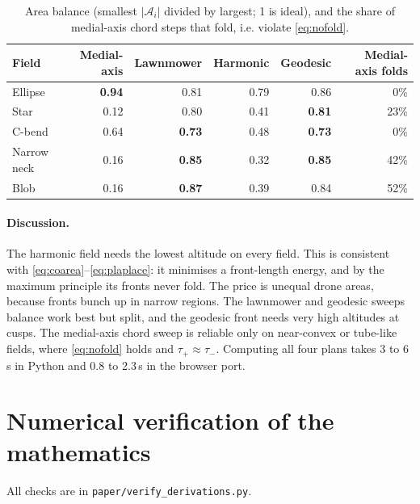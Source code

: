 \documentclass[11pt,a4paper]{article}
\numberwithin{equation}{section}
\theoremstyle{plain}
\theoremstyle{definition}
\theoremstyle{remark}
\begin{document}
\begin{table}[ht]
\centering
\caption{Area balance (smallest $|\mathcal A_i|$ divided by largest; 1 is ideal), and the share of medial-axis chord steps that fold, i.e. violate \eqref{eq:nofold}.}
\label{tab:balance}
\begin{tabular}{lrrrrr}
\toprule
Field & Medial-axis & Lawnmower & Harmonic & Geodesic & Medial-axis folds \\
\midrule
Ellipse     & \textbf{0.94} & 0.81          & 0.79 & 0.86          & 0\%  \\
Star        & 0.12          & 0.80          & 0.41 & \textbf{0.81} & 23\% \\
C-bend      & 0.64          & \textbf{0.73} & 0.48 & \textbf{0.73} & 0\%  \\
Narrow neck & 0.16          & \textbf{0.85} & 0.32 & \textbf{0.85} & 42\% \\
Blob        & 0.16          & \textbf{0.87} & 0.39 & 0.84          & 52\% \\
\bottomrule
\end{tabular}
\end{table}

\paragraph{Discussion.} The harmonic field needs the lowest altitude on every field. This is consistent with \eqref{eq:coarea}--\eqref{eq:plaplace}: it minimises a front-length energy, and by the maximum principle its fronts never fold. The price is unequal drone areas, because fronts bunch up in narrow regions. The lawnmower and geodesic sweeps balance work best but split, and the geodesic front needs very high altitudes at cusps. The medial-axis chord sweep is reliable only on near-convex or tube-like fields, where \eqref{eq:nofold} holds and $\tau_+\approx\tau_-$. Computing all four plans takes 3 to 6\,s in Python and 0.8 to 2.3\,s in the browser port.

\section{Numerical verification of the mathematics}

All checks are in \texttt{paper/verify\_derivations.py}.
\end{document}
